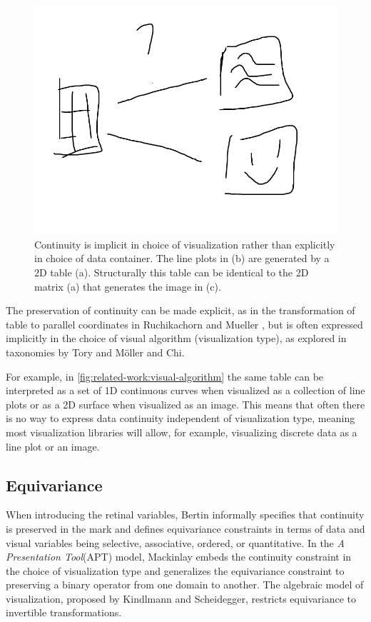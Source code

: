 \documentclass[10pt,journal,compsoc]{IEEEtran}
\theoremstyle{definition}
\theoremstyle{remark}
\begin{document}
\begin{figure}[h!]
  \includegraphics[width=\columnwidth]{whycontinuity.png}
  \caption{Continuity is implicit in choice of visualization rather than explicitly in choice of data container. The line plots in (b) are generated by a 2D table (a). Structurally this table can be identical to the 2D matrix (a) that generates the image in (c).}
  \label{fig:related-work:visual-algorithm}
\end{figure}

 The preservation of continuity can be made explicit, as in the transformation of table to parallel coordinates in Ruchikachorn and Mueller \cite{ruchikachornLearningVisualizationsAnalogy2015}, but is often expressed implicitly in the choice of visual algorithm (visualization type), as explored in taxonomies by Tory and M\"{o}ller \cite{toryRethinkingVisualizationHighlevel2004} and Chi\cite{chiTaxonomyVisualizationTechniques2000}.

For example, in \autoref{fig:related-work:visual-algorithm} the same table can be interpreted as a set of 1D continuous curves when visualized as a collection of line plots or as a 2D surface when visualized as an image.  This means that often there is no way to express data continuity independent of visualization type, meaning most visualization libraries will allow, for example, visualizing discrete data as a line plot or an image.

\subsection{Equivariance}
\label{sec:related-work:equivariance}
When introducing the retinal variables, Bertin informally specifies that continuity is preserved in the mark and defines equivariance constraints in terms of data and visual variables being selective, associative, ordered, or quantitative\cite{bertinSemiologyGraphicsDiagrams2011a}. In the \textit{A Presentation Tool}(APT) model, Mackinlay embeds the continuity constraint in the choice of visualization type and generalizes the equivariance constraint to preserving a binary operator from one domain to another. The algebraic model of visualization\cite{kindlmannAlgebraicProcessVisualization2014}, proposed by Kindlmann and Scheidegger, restricts equivariance to invertible transformations.
\end{document}
